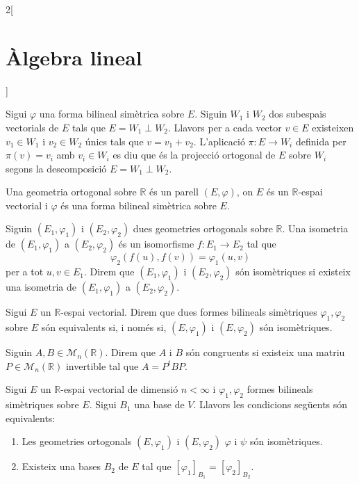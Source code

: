 \documentclass[class=article,10pt,crop=false]{standalone}
\begin{document}
\begin{multicols}{2}[\section{Àlgebra lineal}]
\begin{definition}
\end{definition}
\begin{definition}
Sigui $\varphi$ una forma bilineal simètrica sobre $E$. Siguin $W_1$ i $W_2$ dos subespais vectorials de $E$ tals que $E=W_1\perp W_2$. Llavors per a cada vector $v\in E$ existeixen $v_1\in W_1$ i $v_2\in W_2$ únics tals que $v=v_1+v_2$. L'aplicació $\pi:E\rightarrow W_i$ definida per $\pi(v)=v_i$ amb $v_i\in W_i$ es diu que és la projecció ortogonal de $E$ sobre $W_i$ segons la descomposició $E=W_1\perp W_2$.
\label{perpendicular}
\end{definition}
\begin{definition}
Una geometria ortogonal sobre $\mathbb{R}$ és un parell $(E,\varphi)$, on $E$ és un $\mathbb{R}$-espai vectorial i $\varphi$ és una forma bilineal simètrica sobre $E$.
\end{definition}
\begin{definition}
Siguin $(E_1,\varphi_1)$ i $(E_2,\varphi_2)$ dues geometries ortogonals sobre $\mathbb{R}$. Una isometria de $(E_1,\varphi_1)$ a $(E_2,\varphi_2)$ és un isomorfisme $f:E_1\rightarrow E_2$ tal que $$\varphi_2(f(u),f(v))=\varphi_1(u,v)$$ per a tot $u,v\in E_1$. Direm que $(E_1,\varphi_1)$ i $(E_2,\varphi_2)$ són isomètriques si existeix una isometria de $(E_1,\varphi_1)$ a $(E_2,\varphi_2)$.
\label{isometry}
\end{definition}
\begin{definition}
Sigui $E$ un $\mathbb{R}$-espai vectorial. Direm que dues formes bilineals simètriques $\varphi_1,\varphi_2$ sobre $E$ són equivalents si, i només si, $(E,\varphi_1)$ i $(E,\varphi_2)$ són isomètriques.
\end{definition}
\begin{definition}
Siguin $A,B\in\mathcal{M}_n(\mathbb{R})$. Direm que $A$ i $B$ són congruents si existeix una matriu $P\in\mathcal{M}_n(\mathbb{R})$ invertible tal que $A=P^tBP$.
\end{definition}
\begin{prop}
Sigui $E$ un $\mathbb{R}$-espai vectorial de dimensió $n<\infty$ i $\varphi_1,\varphi_2$ formes bilineals simètriques sobre $E$. Sigui $B_1$ una base de $V$. Llavors les condicions següents són equivalents:
\begin{enumerate}
    \item Les geometries ortogonals $(E,\varphi_1)$ i $(E,\varphi_2)$ $\varphi$ i $\psi$ són isomètriques.
    \item Existeix una bases $B_2$ de $E$ tal que $[\varphi_1]_{B_1}=[\varphi_2]_{B_2}$.

\end{enumerate}
\end{prop}
\end{multicols}
\end{document}
